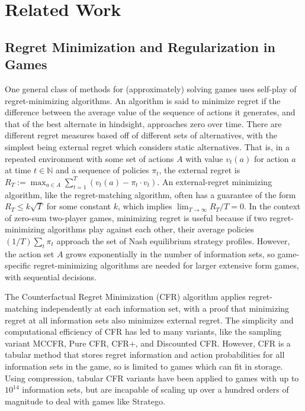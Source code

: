 \section{Related Work}

\subsection{Regret Minimization and Regularization in Games}
One general class of methods for (approximately) solving games uses self-play of regret-minimizing algorithms. An algorithm is said to minimize regret if the difference between the average value of the sequence of actions it generates, and that of the best alternate in hindsight, approaches zero over time. There are different regret measures based off of different sets of alternatives, with the simplest being external regret which considers static alternatives. That is, in a repeated environment with some set of actions $A$ with value $v_t(a)$ for action $a$ at time $t \in \mathbb{N}$ and a sequence of policies $\pi_t$, the external regret is $R_T := \max_{a \in A} \sum_{t=1}^T (v_t(a) - \pi_t \cdot v_t)$. An external-regret minimizing algorithm, like the regret-matching algorithm, often has a guarantee of the form $R_T \le k\sqrt{T}$ for some constant $k$, which implies $\lim_{T \rightarrow \infty} R_T/T  = 0$. In the context of zero-sum two-player games, minimizing regret is useful because if two regret-minimizing algorithms play against each other, their average policies $(1/T) \sum_t \pi_t$ approach the set of Nash equilibrium strategy profiles. However, the action set $A$ grows exponentially in the number of information sets, so game-specific regret-minimizing algorithms are needed for larger extensive form games, with sequential decisions.

The Counterfactual Regret Minimization (CFR) algorithm applies regret-matching independently at each information set, with a proof that minimizing regret at all information sets also minimizes external regret. The simplicity and computational efficiency of CFR has led to many variants, like the sampling variant MCCFR, Pure CFR, CFR+, and Discounted CFR. However, CFR is a tabular method that stores regret information and action probabilities for all information sets in the game, so is limited to games which can fit in storage. Using compression, tabular CFR variants have been applied to games with up to $10^{14}$ information sets, but are incapable of scaling up over a hundred orders of magnitude to deal with games like Stratego.

